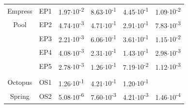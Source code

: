 \begin{table}
\begin{adjustbox}{width=\textwidth,keepaspectratio}
\begin{threeparttable}
\begin{tabular}{clllcc}
Empress & EP1   & 1.97$\cdot 10$\textsuperscript{-2} & 8.63$\cdot 10$\textsuperscript{-1} & 4.45$\cdot 10$\textsuperscript{-1} & 1.09$\cdot 10$\textsuperscript{-2} \\
Pool  & EP2   & 4.74$\cdot 10$\textsuperscript{-3} & 4.71$\cdot 10$\textsuperscript{-1} & 2.91$\cdot 10$\textsuperscript{-1} & 7.83$\cdot 10$\textsuperscript{-3} \\
      & EP3   & 2.21$\cdot 10$\textsuperscript{-3} & 6.06$\cdot 10$\textsuperscript{-1} & 3.61$\cdot 10$\textsuperscript{-1} & 1.15$\cdot 10$\textsuperscript{-2} \\
      & EP4   & 4.08$\cdot 10$\textsuperscript{-3} & 2.31$\cdot 10$\textsuperscript{-1} & 1.43$\cdot 10$\textsuperscript{-1} & 2.98$\cdot 10$\textsuperscript{-3} \\
      & EP5   & 2.78$\cdot 10$\textsuperscript{-3} & 1.26$\cdot 10$\textsuperscript{-1} & 7.19$\cdot 10$\textsuperscript{-2} & 1.12$\cdot 10$\textsuperscript{-3} \\
      &       &       &       &       &  \\
Octopus & OS1   & 1.26$\cdot 10$\textsuperscript{-1} & 4.21$\cdot 10$\textsuperscript{-1} & 1.20$\cdot 10$\textsuperscript{-1} &  \\
Spring & OS2   & 5.08$\cdot 10$\textsuperscript{-6} & 7.60$\cdot 10$\textsuperscript{-3} & 4.21$\cdot 10$\textsuperscript{-3} & 1.46$\cdot 10$\textsuperscript{-4} \\
\bottomrule
\end{tabular}%




  
  \begin{tablenotes}
    

        
  \end{tablenotes}
  
  \label{tab:leftover_props}
  \end{threeparttable}
  \end{adjustbox}
\end{table}
\setcounter{tabcounter}{0} %
\doublespace





